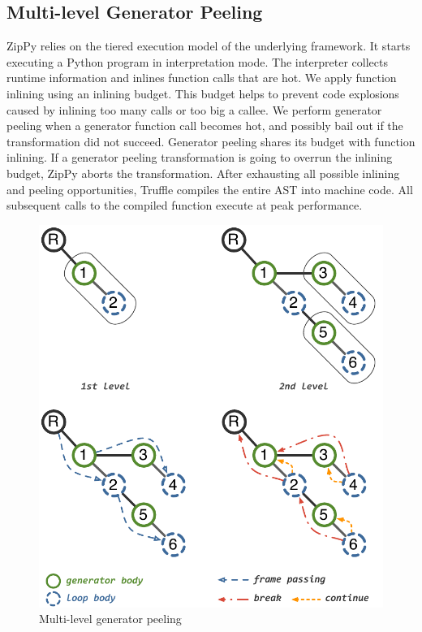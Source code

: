 \subsection{Multi-level Generator Peeling}
\label{sec:ch4-multilevel-peeling}

ZipPy relies on the tiered execution model of the underlying framework.
It starts executing a Python program in interpretation mode.
The interpreter collects runtime information and inlines function calls that are hot.
We apply function inlining using an inlining budget.
This budget helps to prevent code explosions caused by inlining too many calls or too big a callee.
We perform generator peeling when a generator function call becomes hot, and possibly bail out if the transformation did not succeed.
Generator peeling shares its budget with function inlining.
If a generator peeling transformation is going to overrun the inlining budget, ZipPy aborts the transformation.
After exhausting all possible inlining and peeling opportunities, Truffle compiles the entire AST into machine code.
All subsequent calls to the compiled function execute at peak performance.

\begin{figure}
\centering
\includegraphics[scale=.9]{figures/ch4-multilevel-peeling}
\caption{Multi-level generator peeling}
\label{fig:ch4-multilevel-peeling}
\end{figure}

